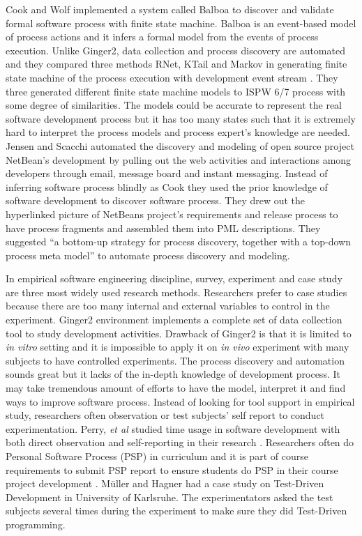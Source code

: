 Cook and Wolf implemented a system called Balboa \cite{Cook:95} to discover
and validate formal software process with finite state machine. Balboa is
an event-based model of process actions and it infers a formal model from
the events of process execution. Unlike Ginger2, data collection and
process discovery are automated and they compared three methods RNet, KTail
and Markov in generating finite state machine of the process execution
with development event stream \cite{Cook:95}. They three generated
different finite state machine models to ISPW 6/7 process with some degree
of similarities. The models could be accurate to represent the real
software development process but it has too many states such that it is
extremely hard to interpret the process models and process expert's
knowledge are needed. Jensen and Scacchi automated the discovery and
modeling of open source project NetBean's development by pulling out the
web activities and interactions among developers through email, message
board and instant messaging\cite{Jensen:04}. Instead of inferring software
process blindly as Cook they used the prior knowledge of software
development to discover software process. They drew out the hyperlinked
picture of NetBeans project's requirements and release process to have
process fragments and assembled them into PML descriptions. They suggested
``a bottom-up strategy for process discovery, together with a top-down
process meta model''\cite{Jensen:04} to automate process discovery and
modeling. 

In empirical software engineering discipline, survey, experiment and case
study are three most widely used research methods. Researchers prefer to
case studies because there are too many internal and external variables to
control in the experiment. Ginger2 environment implements a complete set of
data collection tool to study development activities. Drawback of Ginger2
is that it is limited to \textit{in vitro} setting and it is impossible to
apply it on \textit{in vivo} experiment with many subjects to have
controlled experiments. The process discovery and automation sounds great
but it lacks of the in-depth knowledge of development process. It may take
tremendous amount of efforts to have the model, interpret it and find ways
to improve software process. Instead of looking for tool support in
empirical study, researchers often observation or test subjects' self
report to conduct experimentation. Perry, \textit{et al} studied time usage
in software development with both direct observation and self-reporting in
their research \cite{Perry:95}. Researchers often do Personal Software
Process (PSP) in curriculum and it is part of course requirements to submit
PSP report to ensure students do PSP in their course project development
\cite{Bullers:04,Hou:98}. M\"uller and Hagner had a case study on Test-Driven
Development in University of Karlsruhe\cite{Muller:02}. The experimentators 
asked the test subjects several times during the experiment to make sure
they did Test-Driven programming. 

